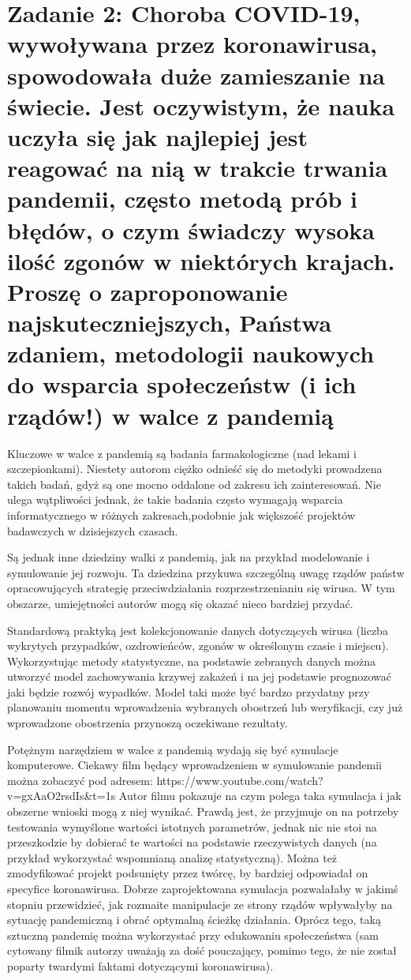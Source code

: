 \documentclass[11pt]{article}   %
\begin{document}
\section*{Zadanie 2: \normalsize{Choroba COVID-19, wywoływana przez koronawirusa, spowodowała duże zamieszanie na
	świecie. Jest oczywistym, że nauka uczyła się jak najlepiej jest reagować na nią w trakcie
	trwania pandemii, często metodą prób i błędów, o czym świadczy wysoka ilość zgonów w
	niektórych krajach. Proszę o zaproponowanie najskuteczniejszych, Państwa zdaniem,
	metodologii naukowych do wsparcia społeczeństw (i ich rządów!) w walce z pandemią}} 
\par Kluczowe w walce z pandemią są badania farmakologiczne (nad lekami i szczepionkami). Niestety autorom ciężko odnieść się do metodyki prowadzena takich badań, gdyż są one mocno oddalone od zakresu ich zainteresowań. Nie ulega wątpliwości jednak, że takie badania często wymagają wsparcia informatycznego w różnych zakresach,podobnie jak większość projektów badawczych w dzisiejszych czasach.
\par Są jednak inne dziedziny walki z pandemią, jak na przykład modelowanie i symulowanie jej rozwoju. Ta dziedzina przykuwa szczególną uwagę rządów państw opracowujących strategię przeciwdziałania rozprzestrzenianiu się wirusa. W tym obszarze, umiejętności autorów mogą się okazać nieco bardziej przydać.
\par  Standardową praktyką jest kolekcjonowanie danych dotyczących wirusa (liczba wykrytych przypadków, ozdrowieńców, zgonów w określonym czasie i miejscu). Wykorzystując metody statystyczne, na podstawie zebranych danych można utworzyć model zachowywania krzywej zakażeń i na jej podstawie prognozować jaki będzie rozwój wypadków. Model taki może być bardzo przydatny przy planowaniu momentu wprowadzenia wybranych obostrzeń lub weryfikacji, czy już wprowadzone obostrzenia przynoszą oczekiwane rezultaty.
\par Potężnym narzędziem w walce z pandemią wydają się być symulacje komputerowe. Ciekawy film będący wprowadzeniem w symulowanie pandemii można zobaczyć pod adresem: \newline https://www.youtube.com/watch?v=gxAaO2rsdIs\&t=1s \newline
Autor filmu pokazuje na czym polega taka symulacja i jak obszerne wnioski mogą z niej wynikać. Prawdą jest, że przyjmuje on na potrzeby testowania wymyślone wartości istotnych parametrów, jednak nic nie stoi na przeszkodzie by dobierać te wartości na podstawie rzeczywistych danych (na przykład wykorzystać wspomnianą analizę statystyczną). Można też zmodyfikować projekt podsunięty przez twórcę, by bardziej odpowiadał on specyfice koronawirusa. Dobrze zaprojektowana symulacja pozwalałaby w jakimś stopniu przewidzieć, jak rozmaite manipulacje ze strony rządów wpływałyby na sytuację pandemiczną i obrać optymalną ścieżkę działania. Oprócz tego, taką sztuczną pandemię można wykorzystać przy edukowaniu społeczeństwa (sam cytowany filmik autorzy uważają za dość pouczający, pomimo tego, że nie został poparty twardymi faktami dotyczącymi koronawirusa).
\end{document}
